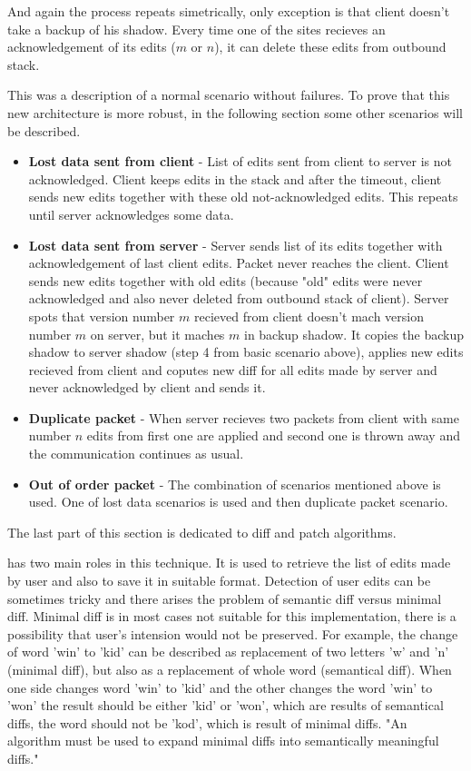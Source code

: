 \documentclass[12pt,oneside]{fithesis2}
\begin{document}
\par And again the process repeats simetrically, only exception is that client doesn't take a backup of his shadow. Every time one of the sites recieves an acknowledgement of its edits (\(m\) or \(n\)), it can delete these edits from outbound stack.
\par This was a description of a normal scenario without failures. To prove that this new architecture is more robust, in the following section some other scenarios will be described.
\begin{itemize}
\item \textbf{Lost data sent from client} - List of edits sent from client to server is not acknowledged. Client keeps edits in the stack and after the timeout, client sends new edits together with these old not-acknowledged edits. This repeats until server acknowledges some data.
\item \textbf{Lost data sent from server} - Server sends list of its edits together with acknowledgement of last client edits. Packet never reaches the client. Client sends new edits together with old edits (because "old" edits were never acknowledged and also never deleted from outbound stack of client). Server spots that version number \(m\) recieved from client doesn't mach version number \(m\) on server, but it maches \(m\) in backup shadow. It copies the backup shadow to server shadow (step 4 from basic scenario above), applies new edits recieved from client and coputes new diff for all edits made by server and never acknowledged by client and sends it.
\item \textbf{Duplicate packet} - When server recieves two packets from client with same number \(n\) edits from first one are applied and second one is thrown away and the communication continues as usual.
\item \textbf{Out of order packet} - The combination of scenarios mentioned above is used. One of lost data scenarios is used and then duplicate packet scenario.\cite{Fraser} 
\end{itemize}
\par The last part of this section is dedicated to diff and patch algorithms. 
\par \underline{} has two main roles in this technique. It is used to retrieve the list of edits made by user and also to save it in suitable format. Detection of user edits can be sometimes tricky and there arises the problem of semantic diff versus minimal diff. Minimal diff is in most cases not suitable for this implementation, there is a possibility that user's intension would not be preserved. For example, the change of word 'win' to 'kid' can be described as replacement of two letters 'w' and 'n' (minimal diff), but also as a replacement of whole word (semantical diff). When one side changes word 'win' to 'kid' and the other changes the word 'win' to 'won' the result should be either 'kid' or 'won', which are results of semantical diffs, the word should not be 'kod', which is result of minimal diffs. "An algorithm must be used to expand minimal diffs into semantically meaningful diffs." \cite{Fraser}
\end{document}
